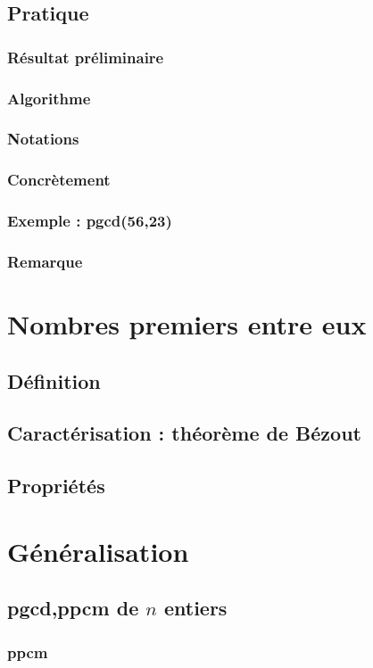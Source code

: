 \documentclass[12pt,a4paper,french]{book}
\begin{document}
		\subsection{Pratique}
			\subsubsection{Résultat préliminaire}
			\subsubsection{Algorithme}
			\subsubsection{Notations}
			\subsubsection{Concrètement}
			\subsubsection{Exemple : pgcd(56,23)}
			\subsubsection{Remarque}
	\section{Nombres premiers entre eux}
		\subsection{Définition}
		\subsection{Caractérisation : théorème de Bézout}
		\subsection{Propriétés}
	\section{Généralisation}
		\subsection{pgcd,ppcm de $n$ entiers}
			\subsubsection{ppcm}
\end{document}
